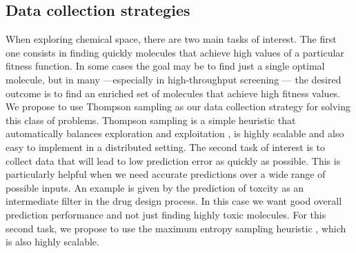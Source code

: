 \subsection{Data collection strategies}

When exploring chemical space, there are two main tasks of interest. The first one consists in finding quickly molecules that achieve high values of a particular fitness function. In some cases the goal may be to find just a single optimal molecule, but in many ---especially in high-throughput screening \cite{Pyzer_Knapp_2015a}--- the desired outcome is to find 
an enriched set of molecules that achieve high fitness values. 
We propose to use Thompson sampling \cite{Thompson_1933} as our data collection strategy for solving this class of problems. Thompson sampling is a simple heuristic that automatically balances exploration and exploitation \cite{Chapelle2011}, is highly scalable and also easy to implement in a distributed setting.
The second task of interest is to collect data that will lead to low prediction error as quickly as possible. This is particularly helpful when we need accurate predictions over a wide range of possible inputs. An example is given by the prediction of toxcity as an intermediate filter in the drug design process. In this case we want good overall prediction performance and not just finding highly toxic molecules. For this second task, we propose to use the maximum entropy sampling heuristic \cite{MacKay_1992}, which is also highly scalable.